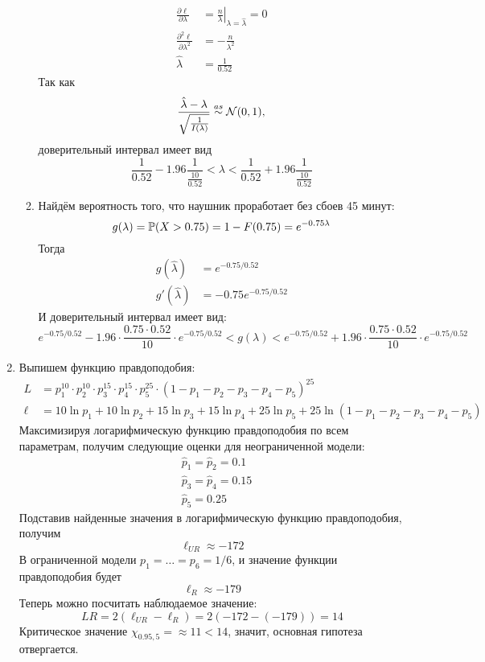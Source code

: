\begin{enumerate}
\begin{enumerate}
\begin{align*}
\frac{\partial \ell}{\partial \lambda} &= \left. \frac{n}{\lambda} \right|_{\lambda = \hat \lambda} = 0 \\
\frac{\partial^2 \ell}{\partial \lambda^2} &= -\frac{n}{\lambda^2} \\
\hat \lambda &= \frac{1}{0.52}
\end{align*}
Так как
\[
\frac{\hat \lambda - \lambda}{\sqrt{\frac{1}{I(\lambda)}}} \stackrel{as}{\sim} \cN(0,1),
\]
доверительный интервал имеет вид
\[
\frac{1}{0.52} - 1.96 \frac{1}{\frac{10}{0.52}} < \lambda < \frac{1}{0.52} + 1.96 \frac{1}{\frac{10}{0.52}}
\]
\item Найдём вероятность того, что наушник проработает без сбоев 45 минут:
\[
g(\lambda) = \P(X > 0.75) = 1 - F(0.75) = e^{-0.75\lambda}
\]
Тогда
\begin{align*}
g(\hat \lambda) &= e^{-0.75 / 0.52} \\
g'(\hat \lambda) &= -0.75 e^{-0.75 / 0.52}
\end{align*}
И доверительный интервал имеет вид:
\[
e^{-0.75 / 0.52} - 1.96 \cdot \frac{0.75 \cdot 0.52}{10} \cdot e^{-0.75 / 0.52} < g(\lambda) < e^{-0.75 / 0.52} + 1.96 \cdot \frac{0.75 \cdot 0.52}{10} \cdot e^{-0.75 / 0.52}
\]
\end{enumerate}
\item Выпишем функцию правдоподобия:
\begin{align*}
L &= p_1^{10} \cdot p_2^{10} \cdot p_3^{15} \cdot p_4^{15} \cdot p_5^{25} \cdot (1 - p_1 - p_2 - p_3 - p_4 - p_5)^{25} \\
\ell &= 10 \ln p_1 + 10 \ln p_2 + 15 \ln p_3 + 15 \ln p_4 + 25 \ln p_5 + 25 \ln (1 - p_1 - p_2 - p_3 - p_4 - p_5)
\end{align*}
Максимизируя логарифмическую функцию правдоподобия по всем параметрам,
получим следующие оценки для неограниченной модели:
\begin{align*}
& \hat p_1 = \hat p_2 = 0.1 \\
& \hat p_3 = \hat p_4 = 0.15 \\
& \hat p_5 = 0.25
\end{align*}
Подставив найденные значения в логарифмическую функцию правдоподобия, получим
\[
\ell_{UR} \approx -172
\]
В ограниченной модели $p_1 = \ldots = p_6 = 1/6$, и значение функции правдоподобия
будет
\[
\ell_R \approx -179
\]
Теперь можно посчитать наблюдаемое значение:
\[
LR = 2(\ell_{UR} - \ell_R) = 2(-172 - (-179)) = 14
\]
Критическое значение $\chi_{0.95, 5} = \approx 11 < 14$, значит, основная гипотеза
отвергается.
\end{enumerate}



